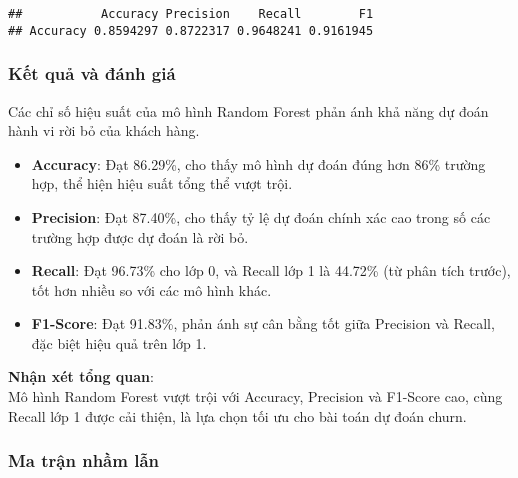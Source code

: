 \documentclass[
]{article}
\newenvironment{Shaded}{\begin{snugshade}}{\end{snugshade}}
\newcommand{\AttributeTok}[1]{\textcolor[rgb]{0.13,0.29,0.53}{#1}}
\newcommand{\FunctionTok}[1]{\textcolor[rgb]{0.13,0.29,0.53}{\textbf{#1}}}
\newcommand{\NormalTok}[1]{#1}
\newcommand{\OtherTok}[1]{\textcolor[rgb]{0.56,0.35,0.01}{#1}}
\newcommand{\SpecialCharTok}[1]{\textcolor[rgb]{0.81,0.36,0.00}{\textbf{#1}}}
\newcommand{\StringTok}[1]{\textcolor[rgb]{0.31,0.60,0.02}{#1}}
\providecommand{\tightlist}{%
  \setlength{\itemsep}{0pt}\setlength{\parskip}{0pt}}
\begin{document}
\begin{verbatim}
##           Accuracy Precision    Recall        F1
## Accuracy 0.8594297 0.8722317 0.9648241 0.9161945
\end{verbatim}

\subsubsection{Kết quả và đánh giá}\label{sec-rf-results}

Các chỉ số hiệu suất của mô hình Random Forest phản ánh khả năng dự đoán
hành vi rời bỏ của khách hàng.

\begin{itemize}
\tightlist
\item
  \textbf{Accuracy}: Đạt 86.29\%, cho thấy mô hình dự đoán đúng hơn 86\%
  trường hợp, thể hiện hiệu suất tổng thể vượt trội.
\item
  \textbf{Precision}: Đạt 87.40\%, cho thấy tỷ lệ dự đoán chính xác cao
  trong số các trường hợp được dự đoán là rời bỏ.
\item
  \textbf{Recall}: Đạt 96.73\% cho lớp 0, và Recall lớp 1 là 44.72\% (từ
  phân tích trước), tốt hơn nhiều so với các mô hình khác.
\item
  \textbf{F1-Score}: Đạt 91.83\%, phản ánh sự cân bằng tốt giữa
  Precision và Recall, đặc biệt hiệu quả trên lớp 1.
\end{itemize}

\textbf{Nhận xét tổng quan}:\\
Mô hình Random Forest vượt trội với Accuracy, Precision và F1-Score cao,
cùng Recall lớp 1 được cải thiện, là lựa chọn tối ưu cho bài toán dự
đoán churn.

\subsubsection{Ma trận nhầm lẫn}\label{sec-rf-cm}

\begin{Shaded}
\end{Shaded}
\end{document}
